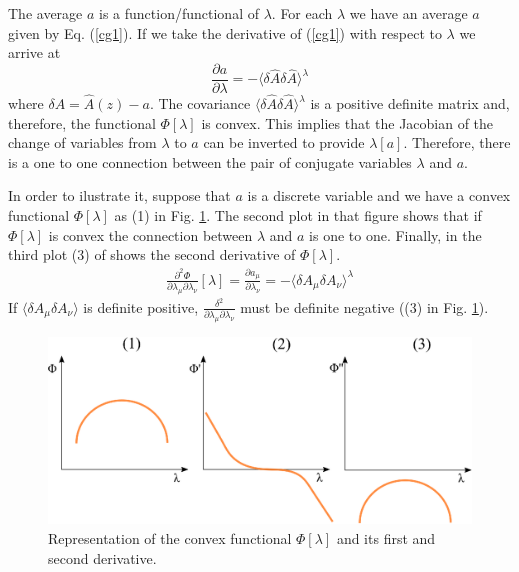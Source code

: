 \documentclass[a4paper,openright,12pt]{book}
\begin{document}
The average $a$  is a function/functional of  $\lambda$. For each
$\lambda$ we  have an average  $a$ given  by Eq. (\ref{cg1}).   If we
take the derivative of (\ref{cg1}) with respect to $\lambda$ we arrive
at
\begin{equation}
\frac{\partial a }{\partial \lambda}= -\langle \delta \hat{A}\delta
\hat{A}\rangle^\lambda
\label{covariances}
\end{equation}
where $\delta  A =  \hat{A}(z)-a$.  The  covariance $\langle  \delta \hat{A}\delta
\hat{A}\rangle^{\lambda}$ is a positive definite matrix and, therefore, the functional
$\Phi[\lambda]$  is convex.  This  implies that  the  Jacobian of  the
change of variables  from $\lambda$ to $a$ can be  inverted to provide
$\lambda[a]$.   Therefore, there  is  a  one to  one  connection
between the  pair of conjugate  variables $\lambda$ and  $a$.

In order to ilustrate it, suppose that $a$ is a discrete variable and we have a convex functional $\Phi[\lambda]$ as (1) in Fig. \ref{fig:PhiConvex}. 
The second plot in that figure shows that if $\Phi[\lambda]$ is convex the connection between $\lambda$ and $a$ is one to one.
Finally, in the third plot (3) of shows the second derivative of $\Phi[\lambda]$.  
\begin{align}
    \frac{\partial^2 \Phi}{\partial\lambda_{\mu}\partial\lambda_{\nu}}[\lambda]
    =\frac{\partial a_{\mu}}{\partial\lambda_{\nu}}
    =-\langle\delta A_{\mu}\delta A_{\nu}\rangle^{\lambda}
\end{align}
If $\langle\delta A_{\mu}\delta A_{\nu}\rangle$ is definite positive, $\frac{\delta^2}{\partial\lambda_{\mu}\partial\lambda_{\nu}}$ must be definite negative ((3) in Fig. \ref{fig:PhiConvex}). 
\begin{figure}
    \centering
    \includegraphics[scale=0.6]{PhiConvex}
    \caption[Connection one to one between $\lambda$ and $a$]{Representation of the convex functional $\Phi[\lambda]$ and its first and second derivative.}
    \label{fig:PhiConvex}
\end{figure}
\end{document}
